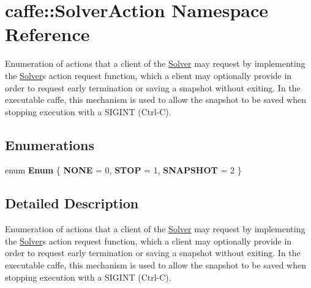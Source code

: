 \hypertarget{namespacecaffe_1_1SolverAction}{}\section{caffe\+:\+:Solver\+Action Namespace Reference}
\label{namespacecaffe_1_1SolverAction}


Enumeration of actions that a client of the \hyperlink{classcaffe_1_1Solver}{Solver} may request by implementing the \hyperlink{classcaffe_1_1Solver}{Solver}\textquotesingle{}s action request function, which a client may optionally provide in order to request early termination or saving a snapshot without exiting. In the executable caffe, this mechanism is used to allow the snapshot to be saved when stopping execution with a S\+I\+G\+I\+NT (Ctrl-\/C).  


\subsection*{Enumerations}
\begin{DoxyCompactItemize}
\item 
enum {\bfseries Enum} \{ {\bfseries N\+O\+NE} = 0, 
{\bfseries S\+T\+OP} = 1, 
{\bfseries S\+N\+A\+P\+S\+H\+OT} = 2
 \}\hypertarget{namespacecaffe_1_1SolverAction_a9d457807cfac957a8277439ed1724be9}{}\label{namespacecaffe_1_1SolverAction_a9d457807cfac957a8277439ed1724be9}

\end{DoxyCompactItemize}


\subsection{Detailed Description}
Enumeration of actions that a client of the \hyperlink{classcaffe_1_1Solver}{Solver} may request by implementing the \hyperlink{classcaffe_1_1Solver}{Solver}\textquotesingle{}s action request function, which a client may optionally provide in order to request early termination or saving a snapshot without exiting. In the executable caffe, this mechanism is used to allow the snapshot to be saved when stopping execution with a S\+I\+G\+I\+NT (Ctrl-\/C). 